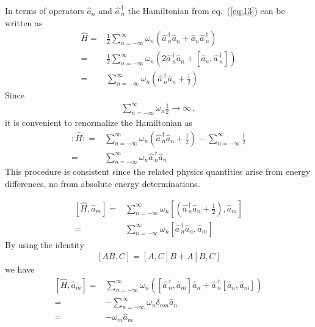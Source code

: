 \begin{frame}
In terms of operators $\widehat{a}_{n}$ and $\widehat{a\,}_{n}^\dagger$ the Hamiltonian from eq.~(\ref{eq:13}) can be written as
\begin{align}
\label{eq:129}
\widehat{H}=&\frac{1}{2}\sum_{n=-\infty}^{\infty} \omega_n (\widehat{a\,}_{n}^\dagger\widehat{a}_{n} +\widehat{a}_{n} \widehat{a\,}_{n}^\dagger)
\nonumber\\
=&\frac{1}{2}\sum_{n=-\infty}^{\infty} \omega_n \left(2\widehat{a\,}_{n}^\dagger\widehat{a}_{n} 
+\left[\widehat{a}_{n}, \widehat{a\,}_{n}^\dagger\right]\right)
\nonumber\\
=&\sum_{n=-\infty}^{\infty} \omega_n \left(\widehat{a\,}_{n}^\dagger\widehat{a}_{n} +\frac{1}{2}\right)
\end{align}
Since
\begin{align}
  \sum_{n=-\infty}^{\infty}\omega_n \frac{1}{2}\to\infty\,,
\end{align}
it is convenient to renormalize the Hamiltonian as
\begin{align}
\label{eq:130}
  \colon\!\widehat{H}\colon=&\sum_{n=-\infty}^{\infty} \omega_n \left(\widehat{a\,}_{n}^\dagger\widehat{a}_{n} +\frac{1}{2}\right)-
  \sum_{n=-\infty}^{\infty} \frac{1}{2}\nonumber\\
=&\sum_{n=-\infty}^{\infty} \omega_n \widehat{a\,}_{n}^\dagger\widehat{a}_{n}
\end{align}
This procedure is consistent since the related physics quantities arise from energy differences, no from absolute energy determinations.

  
\begin{align}
  \left[\widehat{H},\widehat{a}_{m}\right]=&
  \sum_{n=-\infty}^{\infty} \omega_n
  \left[\left(\widehat{a\,}_{n}^\dagger\widehat{a}_{n} +\frac{1}{2}\right),\widehat{a}_{m}\right]\nonumber\\
  =&\sum_{n=-\infty}^{\infty} \omega_n\left[\widehat{a\,}_{n}^\dagger\widehat{a}_{n},\widehat{a}_{m}\right]
\end{align}
By using the identity
\begin{align}
  \left[A B,C\right]=\left[A,C\right]B+A\left[B,C\right]
\end{align}
we have
\begin{align}
\label{eq:19}
   \left[\widehat{H},\widehat{a}_{m}\right]=&
\sum_{n=-\infty}^{\infty} \omega_n\left(
\left[\widehat{a\,}_{n}^\dagger,\widehat{a}_{m}\right]\widehat{a}_{n}
+\widehat{a\,}_{n}^\dagger\left[\widehat{a}_{n},\widehat{a}_{m}\right]
\right)\nonumber\\
=&-\sum_{n=-\infty}^{\infty} \omega_n
\delta_{n m}\widehat{a}_{n}
\nonumber\\
=&- \omega_m\widehat{a}_{m}
\end{align}


\end{frame}
